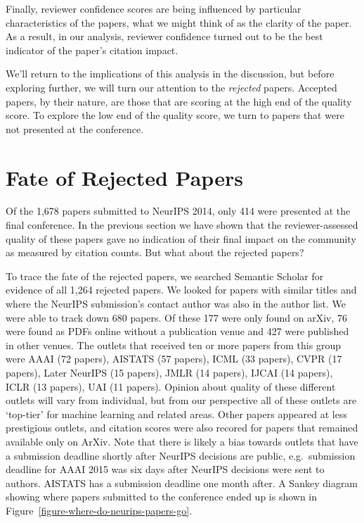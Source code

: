 \documentclass[twoside]{article}
\begin{document}
Finally, reviewer confidence scores are being influenced by particular
characteristics of the papers, what we might think of as the clarity
of the paper. As a result, in our analysis, reviewer confidence turned
out to be the best indicator of the paper's citation impact.

We'll return to the implications of this analysis in the discussion,
but before exploring further, we will turn our attention to the
\emph{rejected} papers. Accepted papers, by their nature, are those
that are scoring at the high end of the quality score. To explore the
low end of the quality score, we turn to papers that were not
presented at the conference.

\section{Fate of Rejected Papers}

Of the 1,678 papers submitted to NeurIPS 2014, only 414 were presented
at the final conference. In the previous section we have shown that
the reviewer-assessed quality of these papers gave no indication of
their final impact on the community as measured by citation
counts. But what about the rejected papers?

To trace the fate of the rejected papers, we searched Semantic Scholar
for evidence of all 1,264 rejected papers. We looked for papers with
similar titles and where the NeurIPS submission's contact author was
also in the author list. We were able to track down 680 papers. Of
these 177 were only found on arXiv, 76 were found as PDFs online
without a publication venue and 427 were published in other
venues. The outlets that received ten or more papers from this group
were AAAI (72 papers), AISTATS (57 papers), ICML (33 papers), CVPR (17
papers), Later NeurIPS (15 papers), JMLR (14 papers), IJCAI (14
papers), ICLR (13 papers), UAI (11 papers).  Opinion about quality of
these different outlets will vary from individual, but from our
perspective all of these outlets are `top-tier' for machine learning
and related areas. Other papers appeared at less prestigious outlets, and citation scores were also recored for papers that remained available only on ArXiv.  Note that there is likely a bias towards outlets
that have a submission deadline shortly after NeurIPS decisions are
public, e.g.\ submission deadline for AAAI 2015 was six days after
NeurIPS decisions were sent to authors. AISTATS has a submission
deadline one month after. A Sankey diagram showing where papers
submitted to the conference ended up is shown in Figure~\ref{figure-where-do-neurips-papers-go}.
\end{document}
